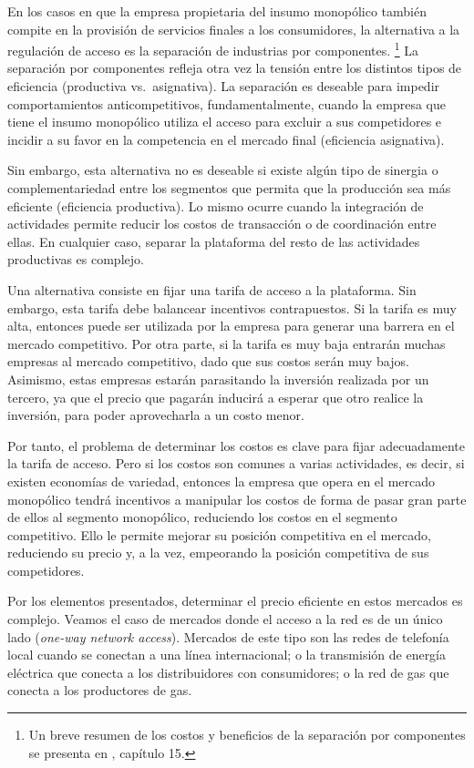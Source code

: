 \documentclass[
  12pt,
  spanish,
]{book}
\begin{document}
En los casos en que la empresa propietaria del insumo monopólico también compite en la provisión de servicios finales a los consumidores, la alternativa a la regulación de acceso es la separación de industrias por componentes.
\footnote{Un breve resumen de los costos y beneficios de la separación por componentes se presenta en \citet{Viscusi2005}, capítulo 15.}
La separación por componentes refleja otra vez la tensión entre los distintos tipos de eficiencia (productiva vs.~asignativa). La separación es deseable para impedir comportamientos anticompetitivos, fundamentalmente, cuando la empresa que tiene el insumo monopólico utiliza el acceso para excluir a sus competidores e incidir a su favor en la competencia en el mercado final (eficiencia asignativa).

Sin embargo, esta alternativa no es deseable si existe algún tipo de sinergia o complementariedad entre los segmentos que permita que la producción sea más eficiente (eficiencia productiva). Lo mismo ocurre cuando la integración de actividades permite reducir los costos de transacción o de coordinación entre ellas. En cualquier caso, separar la plataforma del resto de las actividades productivas es complejo.

Una alternativa consiste en fijar una tarifa de acceso a la plataforma. Sin embargo, esta tarifa debe balancear incentivos contrapuestos. Si la tarifa es muy alta, entonces puede ser utilizada por la empresa para generar una barrera en el mercado competitivo. Por otra parte, si la tarifa es muy baja entrarán muchas empresas al mercado competitivo, dado que sus costos serán muy bajos. Asimismo, estas empresas estarán parasitando la inversión realizada por un tercero, ya que el precio que pagarán inducirá a esperar que otro realice la inversión, para poder aprovecharla a un costo menor.

Por tanto, el problema de determinar los costos es clave para fijar adecuadamente la tarifa de acceso. Pero si los costos son comunes a varias actividades, es decir, si existen economías de variedad, entonces la empresa que opera en el mercado monopólico tendrá incentivos a manipular los costos de forma de pasar gran parte de ellos al segmento monopólico, reduciendo los costos en el segmento competitivo. Ello le permite mejorar su posición competitiva en el mercado, reduciendo su precio y, a la vez, empeorando la posición competitiva de sus competidores.

Por los elementos presentados, determinar el precio eficiente en estos mercados es complejo. Veamos el caso de mercados donde el acceso a la red es de un único lado (\emph{one-way network access}). Mercados de este tipo son las redes de telefonía local cuando se conectan a una línea internacional; o la transmisión de energía eléctrica que conecta a los distribuidores con consumidores; o la red de gas que conecta a los productores de gas.
\end{document}
